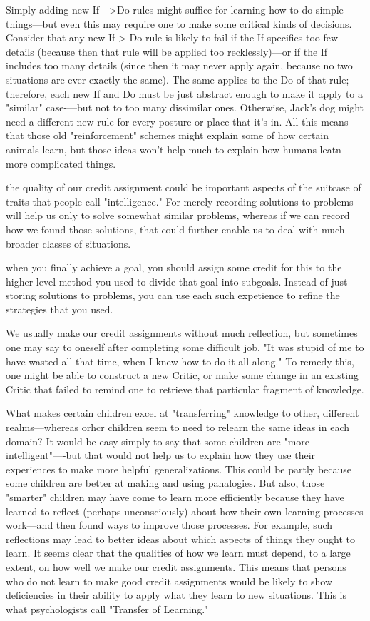\documentclass[10pt,a4paper]{article}
\begin{document}
Simply adding new If—>Do rules might suffice for learning how to do simple things—but even this may require one to make some critical kinds of decisions. Consider that any new If-> Do rule is likely to fail if the If specifies too few details (because then that rule will be applied too recklessly)—or if the If includes too many details (since then it may never apply again, because no two situations are ever exactly the same). The same applies to the Do of that rule; therefore, each new If and Do must be just abstract enough to make it apply to a "similar" case-—but not to too many dissimilar ones. Otherwise, Jack's dog might need a different new rule for every posture or place that it's in. All this means that those old "reinforcement" schemes might explain some of how certain animals learn, but those ideas won't help much to explain how humans leatn more complicated things. \cite[p.~272]{minsky}

the quality of our credit assignment could be important aspects of the suitcase of traits that people call "intelligence." For merely recording solutions to problems will help us only to solve somewhat similar problems, whereas if we can record how we found those solutions, that could further enable us to deal with much broader classes of situations. \cite[p.~272-273]{minsky}

when you finally achieve a goal, you should assign some credit for this to the higher-level method you used to divide that goal into subgoals. Instead of just storing solutions to problems, you can use each such expetience to refine the strategies that you used. \cite[p.~273]{minsky}

We usually make our credit assignments without much reflection, but sometimes one may say to oneself after completing some difficult job, "It was stupid of me to have wasted all that time, when I knew how to do it all along." To remedy this, one might be able to construct a new Critic, or make some change in an existing Critic that failed to remind one to retrieve that particular fragment of knowledge. \cite[p.~274]{minsky}

What makes certain children excel at "transferring" knowledge to other, different realms—whereas orhcr children seem to need to relearn the same ideas in each domain?
It would be easy simply to say that some children are "more intelligent"—-but that would not help us to explain how they use their experiences to make more helpful generalizations. This could be partly because some children are better at making and using panalogies. But also, those "smarter" children may have come to learn more efficiently because they have learned to reflect (perhaps unconsciously) about how their own learning processes work—and then found ways to improve those processes. For example, such reflections may lead to better ideas about which aspects of things they ought to learn.
It seems clear that the qualities of how we learn must depend, to a large extent, on how well we make our credit assignments. This means that persons who do not learn to make good credit assignments would be likely to show deficiencies in their ability to apply what they learn to new situations. This is what psychologists call "Transfer of Learning." \cite[p.~274-275]{minsky}
\end{document}
